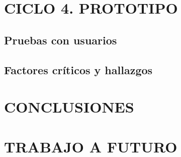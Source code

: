 \documentclass[12pt,letterpaper]{book}
\begin{document}
\newpage

\chapter{CICLO 4. PROTOTIPO}
\section{Pruebas con usuarios}
\section{Factores críticos y hallazgos}

\newpage

\chapter{CONCLUSIONES}

\chapter{TRABAJO A FUTURO}
\end{document}
